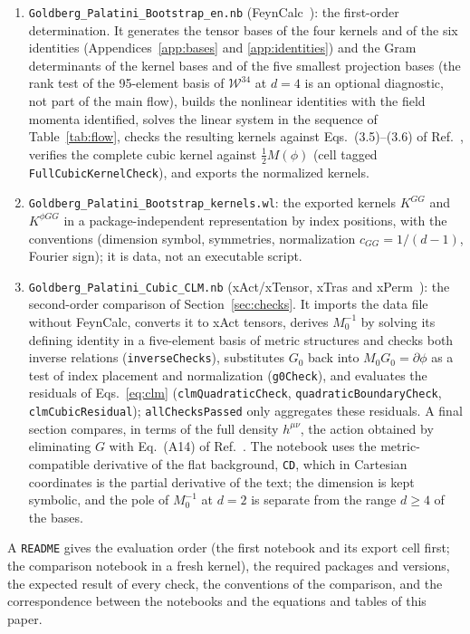 \documentclass[prd,aps,preprint,nofootinbib,amsmath,amssymb,eqsecnum]{revtex4-2}
\newcommand{\W}{\mathcal{W}}
\begin{document}
\begin{enumerate}
\item \texttt{Goldberg\_Palatini\_Bootstrap\_en.nb} (FeynCalc~\cite{FeynCalc}): the first-order
determination. It generates the tensor bases of the four kernels and of the six identities
(Appendices~\ref{app:bases} and \ref{app:identities}) and the Gram determinants of the kernel
bases and of the five smallest projection bases (the rank test of the 95-element basis of
$\W^{34}$ at $d=4$ is an optional diagnostic, not part of the main flow), builds the
nonlinear identities with the field momenta identified, solves the linear system in the sequence of
Table~\ref{tab:flow}, checks the resulting kernels against Eqs.~(3.5)--(3.6) of
Ref.~\cite{BrandtMcKeon2016}, verifies the complete cubic kernel against $\tfrac12M(\phi)$
(cell tagged \texttt{FullCubicKernelCheck}), and exports the normalized kernels.
\item \texttt{Goldberg\_Palatini\_Bootstrap\_kernels.wl}: the exported kernels $K^{GG}$ and
$K^{\phi GG}$ in a package-independent representation by index positions, with the conventions
(dimension symbol, symmetries, normalization $c_{GG}=1/(d-1)$, Fourier sign); it is data,
not an executable script.
\item \texttt{Goldberg\_Palatini\_Cubic\_CLM.nb} (xAct/xTensor, xTras and xPerm~\cite{xAct,xPerm,xTras}):
the second-order comparison of Section~\ref{sec:checks}. It imports the data file without
FeynCalc, converts it to xAct tensors, derives $M_0^{-1}$ by solving its defining identity in
a five-element basis of metric structures and checks both inverse relations
(\texttt{inverseChecks}), substitutes $G_0$ back into $M_0G_0=\partial\phi$ as a test of index
placement and normalization (\texttt{g0Check}), and evaluates the residuals of
Eqs.~\eqref{eq:clm}
(\texttt{clmQuadraticCheck}, \texttt{quadraticBoundaryCheck}, \texttt{clmCubicResidual});
\texttt{allChecksPassed} only aggregates these residuals. A final section compares, in terms of
the full density $h^{\mu\nu}$, the action obtained by eliminating $G$ with Eq.~(A14) of
Ref.~\cite{CLM1973}. The notebook uses the
metric-compatible derivative of the flat background, \texttt{CD}, which in Cartesian
coordinates is the partial derivative of the text; the dimension is kept symbolic, and the
pole of $M_0^{-1}$ at $d=2$ is separate from the range $d\geq4$ of the bases.
\end{enumerate}
A \texttt{README} gives the evaluation order (the first notebook and its export cell first;
the comparison notebook in a fresh kernel), the required packages and versions, the expected
result of every check, the conventions of the comparison, and the correspondence between the
notebooks and the equations and tables of this paper.
\end{document}
